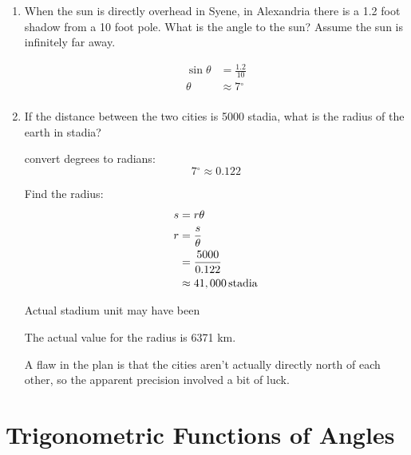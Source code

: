 \documentclass{exam}
\newcommand{\dg}{\ensuremath{^\circ}}
\begin{document}
  \begin{enumerate}
    \item When the sun is directly overhead in Syene, in Alexandria there is a 1.2 foot shadow from a 10 foot pole.
    What is the angle to the sun?  Assume the sun is infinitely far away.

      \begin{solution}
        \begin{align*}
          \sin \theta &= \frac{1.2}{10} \\
          \theta &\approx 7 \dg \\
        \end{align*}
      \end{solution}

    \item If the distance between the two cities is 5000 stadia, what is the radius of the earth in stadia?
      \begin{solution}
        convert degrees to radians:
        \[
          7 \dg \approx 0.122
        \]

        Find the radius:
        \begin{align*}
          s & = r \theta \\
          r & = \frac{s}{\theta} \\
            & = \frac{5000}{0.122} \\
            & \approx \unit[41,000]{stadia} \\
        \end{align*}

        Actual stadium unit may have been 

        The actual value for the radius is 6371 km.

        A flaw in the plan is that the cities aren't actually directly north of each other, so the apparent precision
        involved a bit of luck.

      \end{solution}
  \end{enumerate}

  \section{Trigonometric Functions of Angles}
\end{document}
